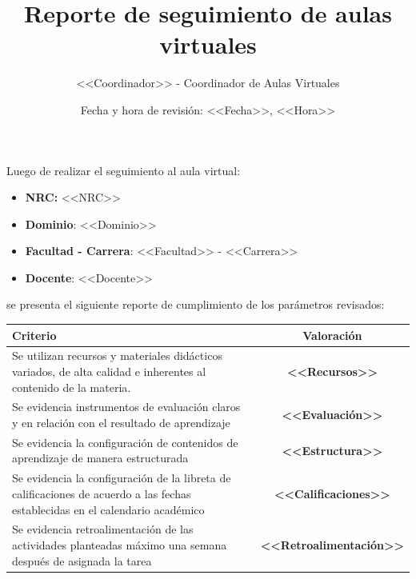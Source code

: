 \documentclass[11pt,a4paper]{article}
\title{\vspace{-2cm}\textbf{Reporte de seguimiento de aulas virtuales}}
\author{<<Coordinador>> - Coordinador de Aulas Virtuales}
\date{Fecha y hora de revisión: <<Fecha>>, <<Hora>>}
\begin{document}
\maketitle

\noindent
Luego de realizar el seguimiento al aula virtual:
\begin{itemize}
\item 
    \textbf{NRC:} <<NRC>>
\item 
    \textbf{Dominio}: <<Dominio>>
\item 
    \textbf{Facultad - Carrera}: <<Facultad>> - <<Carrera>>
\item 
    \textbf{Docente}: <<Docente>>
\end{itemize}
\noindent
se presenta el siguiente reporte de cumplimiento de los parámetros revisados:
\begin{center} \small
\begin{tabular}{@{}L{11cm}c@{}}
\toprule
    \textbf{Criterio} & \textbf{Valoración}\\
\midrule
    Se utilizan recursos y materiales didácticos variados, de alta calidad e inherentes al contenido de la materia.  & \textbf{<<Recursos>>} \\[5mm]
    Se evidencia instrumentos de evaluación claros y en relación con el resultado de aprendizaje  & \textbf{<<Evaluación>>} \\[5mm]
    Se evidencia  la  configuración  de contenidos de aprendizaje   de manera estructurada  & \textbf{<<Estructura>>} \\[5mm]
    Se evidencia la configuración de la libreta de calificaciones de acuerdo a las fechas establecidas en el calendario académico  & \textbf{<<Calificaciones>>} \\[5mm]
    Se evidencia  retroalimentación de las actividades planteadas máximo una semana después de asignada la tarea  & \textbf{<<Retroalimentación>>} \\
\bottomrule
\end{tabular}
\end{center}
\end{document}
